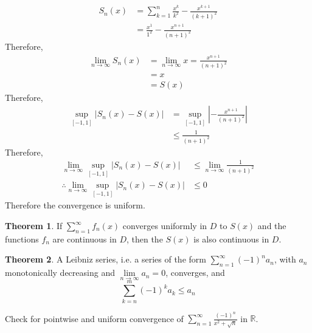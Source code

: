 \documentclass[fleqn, a4paper, 12pt, twoside]{article}
\theoremstyle{definition}
\theoremstyle{theorem}
\newtheorem{theorem}{Theorem}
\begin{document}
\begin{solution}
	\begin{align*}
		S_n(x) & = \sum\limits_{k = 1}^{n} \frac{x^k}{k^2} - \frac{x^{k + 1}}{(k + 1)^2} \\
                       & = \frac{x^1}{1^2} - \frac{x^{n + 1}}{(n + 1)^2}
	\end{align*}
	Therefore,
	\begin{align*}
		\lim\limits_{n \to \infty} S_n(x) & = \lim\limits_{n \to \infty} x = \frac{x^{n + 1}}{(n + 1)^2} \\
                                                  & = x                                                          \\
                                                  & = S(x)
	\end{align*}
	Therefore,
	\begin{align*}
		\sup\limits_{[-1,1]} |S_n(x) - S(x)| & = \sup\limits_{[-1,1]} \left| -\frac{x^{n + 1}}{(n + 1)^2} \right| \\
                                                     & \le \frac{1}{(n + 1)^2}
	\end{align*}
	Therefore,
	\begin{align*}
		\lim\limits_{n \to \infty} \sup\limits_{[-1,1]} |S_n(x) - S(x)|            & \le \lim\limits_{n \to \infty} \frac{1}{(n + 1)^2} \\
		\therefore \lim\limits_{n \to \infty} \sup\limits_{[-1,1]} |S_n(x) - S(x)| & \le 0
	\end{align*}
	Therefore the convergence is uniform.
\end{solution}

\begin{theorem}
	If $\sum\limits_{n = 1}^{\infty} f_n(x)$ converges uniformly in $D$ to $S(x)$ and the functions $f_n$ are continuous in $D$, then the $S(x)$ is also continuous in $D$.
\end{theorem}

\begin{theorem}
	A Leibniz series, i.e. a series of the form $\sum\limits_{n = 1}^{\infty} (-1)^n a_n$, with $a_n$ monotonically decreasing and $\lim\limits_{n \to \infty} a_n = 0$, converges, and
	\begin{equation*}
		\sum\limits_{k = n}^{m} (-1)^k a_k \le a_n
	\end{equation*}
\end{theorem}

\begin{question}
	Check for pointwise and uniform convergence of $\sum\limits_{n = 1}^{\infty} \frac{(-1)^n}{x^2 + \sqrt{n}}$ in $\mathbb{R}$.
\end{question}
\end{document}
